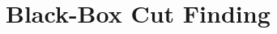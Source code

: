 \documentclass[11pt,letterpaper]{article}
\newcommand{\PME}{\stackrel{\mathclap{\scalebox{.4}{\mbox{PME}}}}{=}}
\newcommand{\kPME}[3]{\mathrm{PME}(#1, #2, #3)}
\newcommand{\nsubset}[1]{[n]\setminus\{#1\}}
\newcommand{\calD}{\mathcal{D}}
\begin{document}
{{{

\section{Black-Box Cut Finding} \label{sec: cut discovery}
}}}
\end{document}
